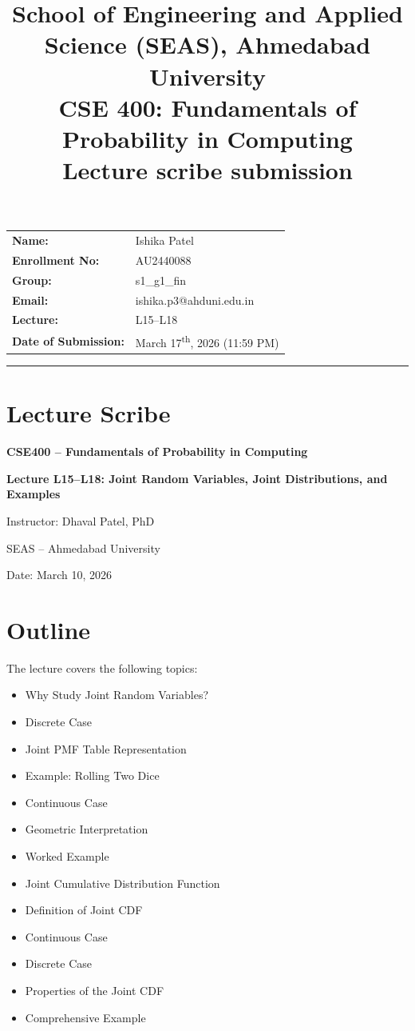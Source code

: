 \documentclass[11pt]{article}
\title{
    \normalsize School of Engineering and Applied Science (SEAS), Ahmedabad University \\
    \vspace{0.2cm}
    \textbf{CSE 400: Fundamentals of Probability in Computing}\\
    \Large Lecture scribe submission
}
\author{}
\date{}
\begin{document}
\maketitle

\vspace{-2cm}
\begin{center}
    \begin{tabular}{ll}
        \textbf{Name:} & Ishika Patel \\[1.5ex]
        \textbf{Enrollment No:} & AU2440088 \\[1.5ex]
        \textbf{Group:} & s1\_g1\_fin \\[1.5ex]
        \textbf{Email:} & ishika.p3@ahduni.edu.in \\[1.5ex]
        \textbf{Lecture:} & L15--L18 \\[1.5ex]
        \textbf{Date of Submission:} & March 17\textsuperscript{th}, 2026 (11:59 PM)
    \end{tabular}
\end{center}

\hrule
\vspace{0.5cm}

\section{Lecture Scribe}

\textbf{CSE400 – Fundamentals of Probability in Computing}

\textbf{Lecture L15--L18: Joint Random Variables, Joint Distributions, and Examples}

Instructor: Dhaval Patel, PhD

SEAS – Ahmedabad University

Date: March 10, 2026

\section{Outline}

The lecture covers the following topics:

\begin{itemize}
\item Why Study Joint Random Variables?
\item Discrete Case
\item Joint PMF Table Representation
\item Example: Rolling Two Dice
\item Continuous Case
\item Geometric Interpretation
\item Worked Example
\item Joint Cumulative Distribution Function
\item Definition of Joint CDF
\item Continuous Case
\item Discrete Case
\item Properties of the Joint CDF
\item Comprehensive Example
\end{itemize}
\end{document}
